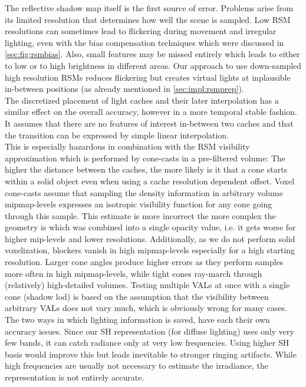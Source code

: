 \documentclass[thesis.tex]{subfiles}
\begin{document}
The reflective shadow map itself is the first source of error.
Problems arise from its limited resolution that determines how well the scene is sampled.
Low RSM resolutions can sometimes lead to flickering during movement and irregular lighting, even with the bias compensation techniques which were discussed in \autoref{sec:fig:rsmbias}.
Also, small features may be missed entirely which leads to either to low or to high brightness in different areas.
Our approach to use down-sampled high resolution RSMs reduces flickering but creates virtual lights at inplausible in-between positions (as already mentioned in \autoref{sec:impl:rsmprep}).
\\
The discretized placement of light caches and their later interpolation has a similar effect on the overall accuracy, however in a more temporal stable fashion.
It assumes that there are no features of interest in-between two caches and that the transition can be expressed by simple linear interpolation.
\\
This is especially hazardous in combination with the RSM visibility approximation which is performed by cone-casts in a pre-filtered volume:
The higher the distance between the caches, the more likely is it that a cone starts within a solid object even when using a cache resolution dependent offset.
Voxel cone-casts assume that sampling the density information in arbitrary volume mipmap-levels expresses an isotropic visibility function for any cone going through this sample.
This estimate is more incorrect the more complex the geometry is which was combined into a single opacity value, i.e. it gets worse for higher mip-levels and lower resolutions.
Additionally, as we do not perform solid voxelization, blockers vanish in high mipmap-levels especially for a high starting resolution.
Larger cone angles produce higher errors as they perform samples more often in high mipmap-levels, while tight cones ray-march through (relatively) high-detailed volumes.
Testing multiple VALs at once with a single cone (shadow lod) is based on the assumption that the visibility between arbitrary VALs does not vary much, which is obviously wrong for many cases.
\\
The two ways in which lighting information is saved, have each their own accuracy issues.
Since our SH representation (for diffuse lighting) uses only very few bands, it can catch radiance only at very low frequencies.
Using higher SH basis would improve this but leads inevitable to stronger ringing artifacts.
While high frequencies are usually not necessary to estimate the irradiance, the representation is not entirely accurate.
\end{document}
